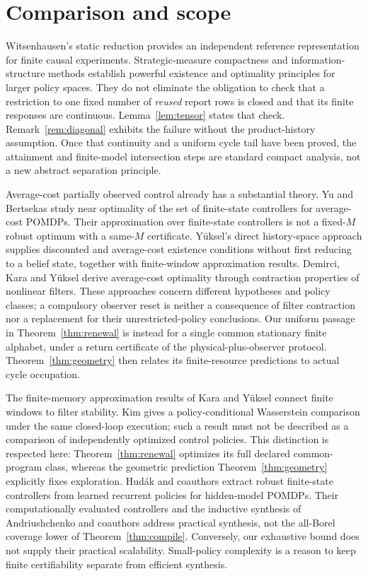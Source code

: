 \section{Comparison and scope}\label{sec:comparison}
Witsenhausen's static reduction \cite{Witsenhausen} provides an independent reference representation for finite causal experiments. Strategic-measure compactness and information-structure methods \cite{YukselSaldi,YuStrategic} establish powerful existence and optimality principles for larger policy spaces. They do not eliminate the obligation to check that a restriction to one fixed number of \emph{reused} report rows is closed and that its finite responses are continuous. Lemma~\ref{lem:tensor} states that check. Remark~\ref{rem:diagonal} exhibits the failure without the product-history assumption. Once that continuity and a uniform cycle tail have been proved, the attainment and finite-model intersection steps are standard compact analysis, not a new abstract separation principle.

Average-cost partially observed control already has a substantial theory. Yu and Bertsekas \cite{YuBertsekas} study near optimality of the set of finite-state controllers for average-cost POMDPs. Their approximation over finite-state controllers is not a fixed-$M$ robust optimum with a same-$M$ certificate. Y\"uksel's direct history-space approach \cite{YukselHistory} supplies discounted and average-cost existence conditions without first reducing to a belief state, together with finite-window approximation results. Demirci, Kara and Y\"uksel \cite{Demirci} derive average-cost optimality through contraction properties of nonlinear filters. These approaches concern different hypotheses and policy classes; a compulsory observer reset is neither a consequence of filter contraction nor a replacement for their unrestricted-policy conclusions. Our uniform passage in Theorem~\ref{thm:renewal} is instead for a single common stationary finite alphabet, under a return certificate of the physical-plus-observer protocol. Theorem~\ref{thm:geometry} then relates its finite-resource predictions to actual cycle occupation.

The finite-memory approximation results of Kara and Y\"uksel \cite{KaraYuksel} connect finite windows to filter stability. Kim \cite{Kim} gives a policy-conditional Wasserstein comparison under the same closed-loop execution; such a result must not be described as a comparison of independently optimized control policies. This distinction is respected here: Theorem~\ref{thm:renewal} optimizes its full declared common-program class, whereas the geometric prediction Theorem~\ref{thm:geometry} explicitly fixes exploration. Hud\'ak and coauthors \cite{Hudak} extract robust finite-state controllers from learned recurrent policies for hidden-model POMDPs. Their computationally evaluated controllers and the inductive synthesis of Andriushchenko and coauthors \cite{Inductive} address practical synthesis, not the all-Borel coverage lower of Theorem~\ref{thm:compile}. Conversely, our exhaustive bound does not supply their practical scalability. Small-policy complexity \cite{Mundhenk} is a reason to keep finite certifiability separate from efficient synthesis.

